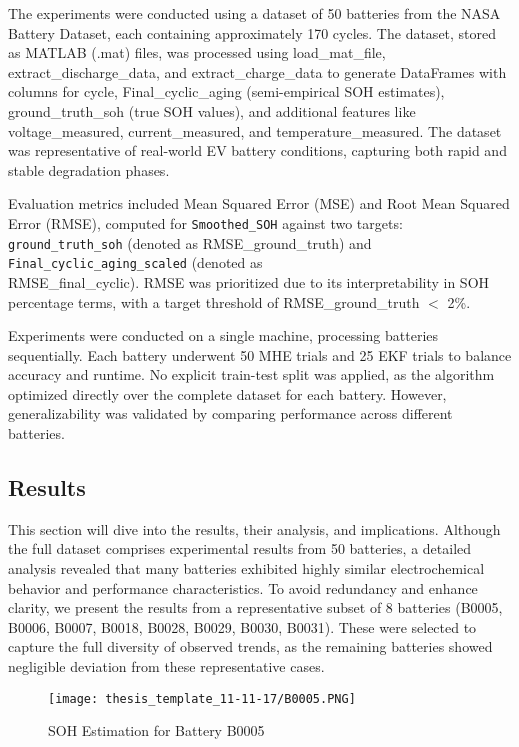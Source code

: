 The experiments were conducted using a dataset of 50 batteries from the NASA Battery Dataset, each containing approximately 170 cycles. The dataset, stored as MATLAB (.mat) files, was processed using load\_mat\_file, extract\_discharge\_data, and extract\_charge\_data to generate DataFrames with columns for cycle, Final\_cyclic\_aging (semi-empirical SOH estimates), ground\_truth\_soh (true SOH values), and additional features like voltage\_measured, current\_measured, and temperature\_measured. The dataset was representative of real-world EV battery conditions, capturing both rapid and stable degradation phases.

Evaluation metrics included Mean Squared Error (MSE) and Root Mean Squared Error (RMSE), computed for \texttt{Smoothed\_SOH} against two targets: \texttt{ground\_truth\_soh} (denoted as RMSE\_ground\_truth) and \texttt{Final\_cyclic\_aging\_scaled} (denoted as\\ RMSE\_final\_cyclic). RMSE was prioritized due to its interpretability in SOH percentage terms, with a target threshold of RMSE\_ground\_truth $<$ 2\%.

Experiments were conducted on a single machine, processing batteries sequentially. Each battery underwent 50 MHE trials and 25 EKF trials to balance accuracy and runtime. No explicit train-test split was applied, as the algorithm optimized directly over the complete dataset for each battery. However, generalizability was validated by comparing performance across different batteries.

\subsection{Results}
This section will dive into the results, their analysis, and implications. Although the full dataset comprises experimental results from 50 batteries, a detailed analysis revealed that many batteries exhibited highly similar electrochemical behavior and performance characteristics. To avoid redundancy and enhance clarity, we present the results from a representative subset of 8 batteries (B0005, B0006, B0007, B0018, B0028, B0029, B0030, B0031). These were selected to capture the full diversity of observed trends, as the remaining batteries showed negligible deviation from these representative cases.

\begin{figure}
    \centering
    \texttt{[image: thesis\_template\_11-11-17/B0005.PNG]}
    \caption{SOH Estimation for Battery B0005}
    \label{fig:resB0005}
\end{figure}

